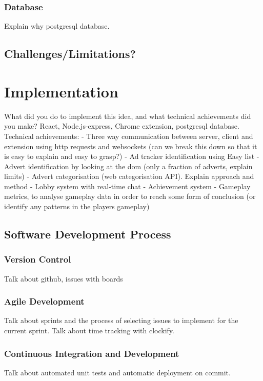 \documentclass{l4proj}
\begin{document}
\subsection{Database}
Explain why postgresql database.

\section{Challenges/Limitations?}


\chapter{Implementation}
\label{implementation}
What did you do to implement this idea, and what technical achievements did you make? 
React, Node.js-express, Chrome extension, postgresql database. 
Technical achievements:
- Three way communication between server, client and extension using http requests and websockets (can we break this down so that it is easy to explain and easy to grasp?)
- Ad tracker identification using Easy list
- Advert identification by looking at the dom (only a fraction of adverts, explain limits)
- Advert categorisation (web categorisation API). Explain approach and method
- Lobby system with real-time chat
- Achievement system
- Gameplay metrics, to analyse gameplay data in order to reach some form of conclusion (or identify any patterns in the players gameplay)


\section{Software Development Process}
\subsection{Version Control}
Talk about github, issues with boards

\subsection{Agile Development}
Talk about sprints and the process of selecting issues to implement for the current sprint. Talk about time tracking with clockify.

\subsection{Continuous Integration and Development}
Talk about automated unit tests and automatic deployment on commit.
\end{document}
